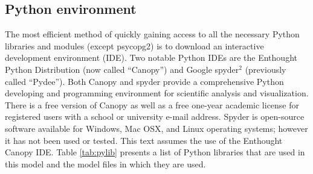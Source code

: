 \subsection{Python environment}
\label{sec:mespy}
The most efficient method of quickly gaining access to all the necessary Python libraries and modules (except psycopg2) is to download an interactive development environment (IDE).  
Two notable Python IDEs are the Enthought Python Distribution\footnotemark {} (now called ``Canopy'') and Google spyder$^{2}$\footnotemark {} (previously called ``Pydee'').  
Both Canopy and spyder provide a comprehensive Python developing and programming environment for scientific analysis and visualization.  
There is a free version of Canopy as well as a free one-year academic license for registered users with a school or university e-mail address. 
Spyder is open-source software available for Windows, Mac OSX, and Linux operating systems; however it has not been used or tested.  
This text assumes the use of the Enthought Canopy IDE.
Table \ref{tab:pylib} presents a list of Python libraries that are used in this model and the model files in which they are used.

